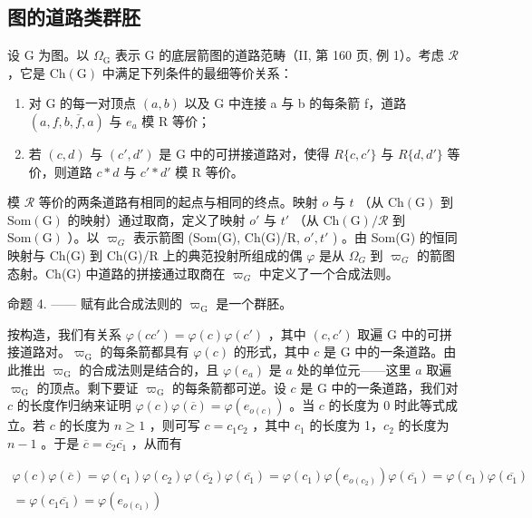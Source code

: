 \subsection{图的道路类群胚}

设 G 为图。以 \(\Omega_{\mathrm{G}}\) 表示 G 的底层箭图的道路范畴（II, 第 160 页, 例 1）。考虑 \(\mathcal{R}\) ，它是 \(\mathrm{Ch(G)}\) 中满足下列条件的最细等价关系：

\begin{enumerate}
\def\labelenumi{(\roman{enumi})}
\item
  对 G 的每一对顶点 \((a,b)\) 以及 G 中连接 a 与 b 的每条箭 f，道路 \((a,f,b,\overline{f},a)\) 与 \(e_{a}\) 模 R 等价；
\item
  若 \((c,d)\) 与 \((c',d')\) 是 G 中的可拼接道路对，使得 \(R\{c,c'\}\) 与 \(R\{d,d'\}\) 等价，则道路 \(c*d\) 与 \(c'*d'\) 模 R 等价。
\end{enumerate}

模 \(\mathcal{R}\) 等价的两条道路有相同的起点与相同的终点。映射 \(o\) 与 \(t\) （从 \(\mathrm{Ch(G)}\) 到 \(\mathrm{Som(G)}\) 的映射）通过取商，定义了映射 \(o'\) 与 \(t'\) （从 \(\mathrm{Ch(G)/\mathcal{R}}\) 到 \(\mathrm{Som(G)}\) ）。以 \(\varpi_{G}\) 表示箭图 (Som(G), Ch(G)/R, \(o', t'\) ) 。由 Som(G) 的恒同映射与 Ch(G) 到 Ch(G)/R 上的典范投射所组成的偶 \(\varphi\) 是从 \(\Omega_{G}\) 到 \(\varpi_{G}\) 的箭图态射。Ch(G) 中道路的拼接通过取商在 \(\varpi_{G}\) 中定义了一个合成法则。

命题 4. —— 赋有此合成法则的 \(\varpi_{\mathrm{G}}\) 是一个群胚。

按构造，我们有关系 \(\varphi(cc') = \varphi(c)\varphi(c')\) ，其中 \((c,c')\) 取遍 G 中的可拼接道路对。\(\varpi_{\mathrm{G}}\) 的每条箭都具有 \(\varphi(c)\) 的形式，其中 \(c\) 是 G 中的一条道路。由此推出 \(\varpi_{\mathrm{G}}\) 的合成法则是结合的，且 \(\varphi(e_a)\) 是 \(a\) 处的单位元——这里 \(a\) 取遍 \(\varpi_{\mathrm{G}}\) 的顶点。剩下要证 \(\varpi_{\mathrm{G}}\) 的每条箭都可逆。设 \(c\) 是 G 中的一条道路，我们对 \(c\) 的长度作归纳来证明 \(\varphi(c)\varphi(\overline{c}) = \varphi(e_{o(c)})\) 。当 \(c\) 的长度为 0 时此等式成立。若 \(c\) 的长度为 \(n \geqslant 1\) ，则可写 \(c = c_1c_2\) ，其中 \(c_1\) 的长度为 1，\(c_2\) 的长度为 \(n - 1\) 。于是 \(\overline{c} = \overline{c_2}\overline{c_1}\) ，从而有

\[
\begin{array}{c} \varphi (c) \varphi (\overline {{c}}) = \varphi (c _ {1}) \varphi (c _ {2}) \varphi (\overline {{c _ {2}}}) \varphi (\overline {{c _ {1}}}) = \varphi (c _ {1}) \varphi (e _ {o (c _ {2})}) \varphi (\overline {{c _ {1}}}) = \varphi (c _ {1}) \varphi (\overline {{c _ {1}}}) \\ = \varphi (c _ {1} \overline {{c _ {1}}}) = \varphi (e _ {o (c _ {1})}) \end{array}
\]


